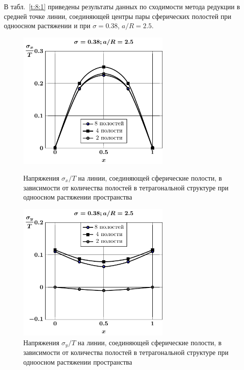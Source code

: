 В табл.~\ref{t:8:1} приведены результаты данных по сходимости метода редукции в средней точке линии, соединяющей центры пары сферических полостей при одноосном растяжении и при $\sigma=0.38$, $a/R=2.5$.

\begin{figure}[h!]
\centering\footnotesize
\parbox[b]{7.5cm}{\centering\includegraphics[width=7.6cm]{cav8-4-2-sig_x-spheres.pdf}
\caption{Напряжения $\sigma_x/T$ на линии, соединяющей сферические полости, в зависимости от количества полостей в тетрагональной структуре при одноосном растяжении пространства
\label{f:8:6}}}\hfil\hfil
\parbox[b]{7.5cm}{\centering\includegraphics[width=7.6cm]{cav8-4-2-sig_y-spheres.pdf}
\caption{Напряжения $\sigma_y/T$ на линии, соединяющей сферические полости, в зависимости от количества полостей в тетрагональной структуре при одноосном растяжении пространства
\label{f:8:7}}}
\end{figure}

%

